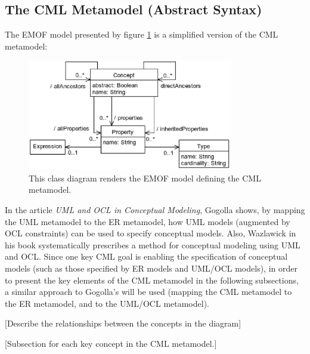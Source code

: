 \pagebreak[5]
\subsection{The CML Metamodel (Abstract Syntax)}\label{subsec:metamodel}

The EMOF \cite{mof} model presented by figure \ref{fig:metamodel} is a simplified version of the CML metamodel:

\begin{figure}
\centering
\includegraphics[width=0.8\textwidth]{language/diagram-metamodel}
\caption{This class diagram renders the EMOF \cite{mof} model defining the CML metamodel.}
\label{fig:metamodel}
\end{figure}


In the article \emph{UML and OCL in Conceptual Modeling}, 
Gogolla \cite{gogolla} shows, by mapping the UML \cite{uml} metamodel to the ER \cite{er} metamodel,
how UML models (augmented by OCL \cite{ocl} constraints) can be used to specify conceptual models.
Also, Wazlawick \cite{wazlawick} in his book systematically prescribes a method for conceptual modeling using UML and OCL. 
Since one key CML goal is enabling the specification of conceptual models
(such as those specified by ER models and UML/OCL models),
in order to present the key elements of the CML metamodel in the following subsections,
a similar approach to Gogolla's will be used 
(mapping the CML metamodel to the ER metamodel, and to the UML/OCL metamodel).

[Describe the relationships between the concepts in the diagram]

[Subsection for each key concept in the CML metamodel.]